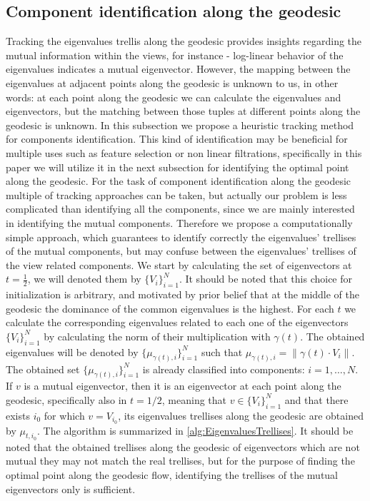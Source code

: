 \documentclass[]{article}
\theoremstyle{definition}
\begin{document}
	\subsection{Component identification along the geodesic}
	Tracking the eigenvalues trellis along the geodesic provides insights regarding the mutual information within the views, for instance - log-linear behavior of the eigenvalues indicates a mutual eigenvector. However, the mapping between the eigenvalues at adjacent points along the geodesic is unknown to us, in other words: at each point along the geodesic we can calculate the eigenvalues and eigenvectors, but the matching between those tuples at different points along the geodesic is unknown. In this subsection we propose a heuristic tracking method for components identification. This kind of identification may be beneficial for multiple uses such as feature selection or non linear filtrations, specifically in this paper we will utilize it in the next subsection for identifying the optimal point along the geodesic.
	For the task of component identification along the geodesic multiple of tracking approaches can be taken, but actually our problem is less complicated than identifying all the components, since we are mainly interested in identifying the mutual components. Therefore we propose a computationally simple approach, which guarantees to identify correctly the eigenvalues' trellises of the mutual components, but may confuse between the eigenvalues' trellises of the view related components.
	We start by calculating the set of eigenvectors at $t=\frac{1}{2}$, we will denoted them by $\{V_i\}_{i=1}^N$. It should be noted that this choice for initialization is arbitrary, and motivated by prior belief that at the middle of the geodesic the dominance of the common eigenvalues is the highest. 
	For each $t$ we calculate the corresponding eigenvalues related to each one of the eigenvectors $\{V_i\}_{i=1}^N$ by calculating the norm of their multiplication with $\gamma(t)$. The obtained eigenvalues will be denoted by $\{ \mu_{\gamma(t),i} \}_{i=1}^N$ such that $\mu_{\gamma(t),i}= \|\gamma(t)\cdot V_i \|$. The obtained set $\{ \mu_{\gamma(t),i} \}_{i=1}^N$ is already classified into components: $i=1,\ldots,N$. If $v$ is a mutual eigenvector, then it is an eigenvector at each point along the geodesic, specifically also in $t=1/2$, meaning that $v \in \{V_i\}_{i=1}^N$ and that there exists $i_0$ for which $v= V_{i_0}$, its eigenvalues trellises along the geodesic are obtained by $\mu_{t,i_0}$. The algorithm is summarized in \ref{alg:EigenvaluesTrellises}.
	It should be noted that the obtained trellises along the geodesic of eigenvectors which are not mutual they may not match the real trellises, but for the purpose of finding the optimal point along the geodesic flow, identifying the trellises of the mutual eigenvectors only is sufficient. 
	
\end{document}
